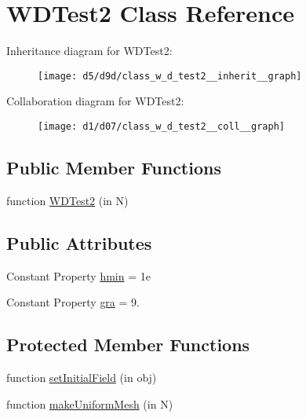 \hypertarget{class_w_d_test2}{}\section{W\+D\+Test2 Class Reference}
\label{class_w_d_test2}


Inheritance diagram for W\+D\+Test2\+:
\nopagebreak
\begin{figure}[H]
\begin{center}
\leavevmode
\texttt{[image: d5/d9d/class\_w\_d\_test2\_\_inherit\_\_graph]}
\end{center}
\end{figure}


Collaboration diagram for W\+D\+Test2\+:
\nopagebreak
\begin{figure}[H]
\begin{center}
\leavevmode
\texttt{[image: d1/d07/class\_w\_d\_test2\_\_coll\_\_graph]}
\end{center}
\end{figure}
\subsection*{Public Member Functions}
\begin{DoxyCompactItemize}
\item 
function \hyperlink{class_w_d_test2_aa29fe63897c36a46265f369f7a4142a6}{W\+D\+Test2} (in N)
\end{DoxyCompactItemize}
\subsection*{Public Attributes}
\begin{DoxyCompactItemize}
\item 
Constant Property \hyperlink{class_w_d_test2_af0fee435fd480238cca0b66f9baa4e8c}{hmin} = 1e
\item 
Constant Property \hyperlink{class_w_d_test2_af1108f60d556ea1adc21fc218e053d94}{gra} = 9.
\end{DoxyCompactItemize}
\subsection*{Protected Member Functions}
\begin{DoxyCompactItemize}
\item 
function \hyperlink{class_w_d_test2_aecded0e8644edc9dcdf66edf942c9a95}{set\+Initial\+Field} (in obj)
\item 
function \hyperlink{class_w_d_test2_a3687d8ffd1210ab53fe0a20d19ce3084}{make\+Uniform\+Mesh} (in N)
\end{DoxyCompactItemize}


